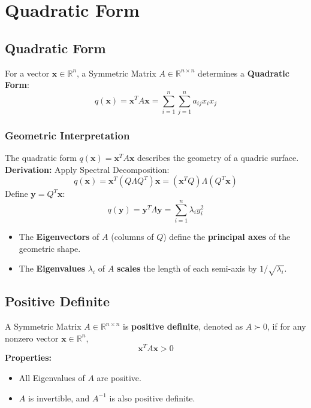 \documentclass{article}
\begin{document}
\newpage
\section{Quadratic Form}

\subsection{Quadratic Form}
For a vector $\mathbf{x} \in \mathbb{R}^n$, a Symmetric Matrix $A \in \mathbb{R}^{n \times n}$ determines a \textbf{Quadratic Form}:
\[
    q(\mathbf{x}) = \mathbf{x}^T A \mathbf{x} = \sum_{i=1}^n \sum_{j=1}^n a_{ij} x_i x_j
\]

\subsubsection{Geometric Interpretation}
The quadratic form $q(\mathbf{x}) = \mathbf{x}^T A \mathbf{x}$ describes the geometry of a quadric surface.
\newline
\textbf{Derivation:}
\newline
Apply Spectral Decomposition:
\[
    q(\mathbf{x}) = \mathbf{x}^T (Q \Lambda Q^T) \mathbf{x} = (\mathbf{x}^T Q) \Lambda (Q^T \mathbf{x})
\]
Define $\mathbf{y} = Q^T \mathbf{x}$:
\[
    q(\mathbf{y}) = \mathbf{y}^T \Lambda \mathbf{y} = \sum_{i=1}^n \lambda_i y_i^2
\]
\begin{itemize}
    \item The \textbf{Eigenvectors} of $A$ (columns of $Q$) define the \textbf{principal axes} of the geometric shape.
    \item The \textbf{Eigenvalues} $\lambda_i$ of $A$ \textbf{scales} the length of each semi-axis by $1/\sqrt{\lambda_i}$.
\end{itemize}

\subsection{Positive Definite}
A Symmetric Matrix $A \in \mathbb{R}^{n \times n}$ is \textbf{positive definite}, denoted as $A \succ 0$, if for any nonzero vector $\mathbf{x} \in \mathbb{R}^n$,
\[
    \mathbf{x}^T A \mathbf{x} > 0
\]
\textbf{Properties:}
\begin{itemize}
    \item All Eigenvalues of $A$ are positive.
    \item $A$ is invertible, and $A^{-1}$ is also positive definite.
\end{itemize}
\end{document}
